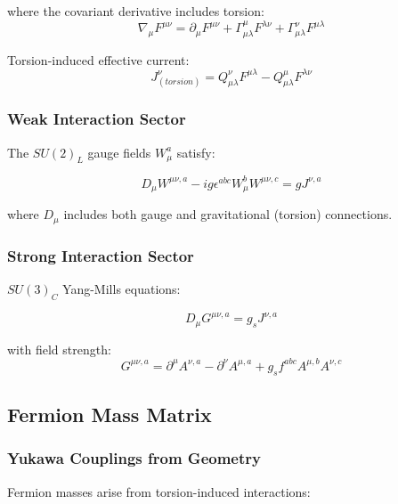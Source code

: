 where the covariant derivative includes torsion:
\begin{equation}
    \nabla_\mu F^{\mu\nu} = \partial_\mu F^{\mu\nu} + \Gamma^\mu_{\mu\lambda}F^{\lambda\nu} + \Gamma^\nu_{\mu\lambda}F^{\mu\lambda}
\end{equation}

Torsion-induced effective current:
\begin{equation}
    J^\nu_{(torsion)} = Q_{\mu\lambda}^{\nu}F^{\mu\lambda} - Q_{\mu\lambda}^{\mu}F^{\lambda\nu}
\end{equation}

\subsubsection{Weak Interaction Sector}

The $SU(2)_L$ gauge fields $W_\mu^a$ satisfy:

\begin{equation}
    D_\mu W^{\mu\nu,a} - ig\epsilon^{abc}W_\mu^b W^{\mu\nu,c} = g J^{\nu,a}
\end{equation}

where $D_\mu$ includes both gauge and gravitational (torsion) connections.

\subsubsection{Strong Interaction Sector}

$SU(3)_C$ Yang-Mills equations:

\begin{equation}
    D_\mu G^{\mu\nu,a} = g_s J^{\nu,a}
\end{equation}

with field strength:
\begin{equation}
    G^{\mu\nu,a} = \partial^\mu A^{\nu,a} - \partial^\nu A^{\mu,a} + g_s f^{abc}A^{\mu,b}A^{\nu,c}
\end{equation}

\subsection{Fermion Mass Matrix}

\subsubsection{Yukawa Couplings from Geometry}

Fermion masses arise from torsion-induced interactions:

